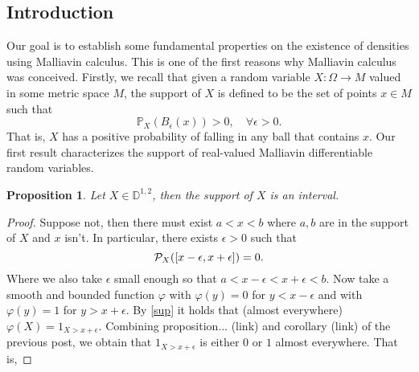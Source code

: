\documentclass[12pt]{article}
\newtheorem{proposition}{Proposition}
\begin{document}
\begin{CJK*}{UTF8}{gbsn}
	\section{Introduction}
	Our goal is to establish some fundamental properties on the existence of densities using Malliavin calculus. This is one of the first reasons why Malliavin calculus was conceived. Firstly, we recall that given a random variable $X:\Omega\to M$ valued in some metric space $M$, the support of  $X$ is defined to be the set of points $x\in M$ such that
	\begin{equation*}
		\mathbb{P}_X(B_\epsilon(x))>0,\quad\forall \epsilon>0.
	\end{equation*}
	That is, $X$ has a positive probability of falling in any ball that contains  $x$. Our first result characterizes the support of real-valued Malliavin differentiable random variables.
	\begin{proposition}
		Let $X\in \mathbb{D}^{1,2}$, then the support of $X$ is an interval.
	\end{proposition}
	\begin{proof}
		Suppose not, then there must exist $a<x<b$ where  $a,b$ are in the support of  $X$ and  $x$ isn't. In particular, there exists  $\epsilon >0$ such that
		\begin{equation}\label{sup}
			\mathcal{P}_X([x-\epsilon ,x+\epsilon ])=0.
		\end{equation}
		Where we also take $\epsilon$ small enough so that $a<x-\epsilon<x+\epsilon<b$.
		Now take a smooth and bounded function $\varphi$ with $\varphi(y)=0$ for $y<x-\epsilon $ and with $\varphi(y)=1$ for $y>x+\epsilon$. By \eqref{sup} it holds that (almost everywhere) $\varphi(X)=1_{X>x+\epsilon}$. Combining proposition... (link) and corollary (link) of the previous post, we obtain that $1_{X>x+\epsilon}$ is either $0$ or $1$ almost everywhere. That is,


\end{proof}
\end{CJK*}
\end{document}
